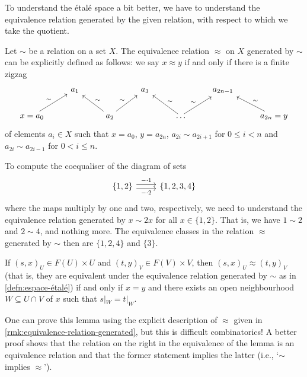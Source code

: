 To understand the étalé space a bit better, we have to understand the equivalence relation generated by the given relation, with respect to which we take the quotient.

\begin{rmk}\label{rmk:equivalence-relation-generated}
Let $\sim$ be a relation on a set $X$.
The equivalence relation $\approx$ on $X$ generated by $\sim$ can be explicitly defined as follows: we say $x\approx y$ if and only if there is a finite zigzag
\begin{equation*}
    \begin{tikzcd}
        & a_1 & & a_3 & & a_{2n-1} \\
        x = a_0 \ar[ru, "\sim"] & & a_2 \ar[lu, "\sim"'] \ar[ru, "\sim"] & & \ldots \ar[lu, "\sim"'] \ar[ru, "\sim"] & & a_{2n}=y \ar[lu, "\sim"']
    \end{tikzcd}
\end{equation*}
of elements $a_i\in X$ such that $x=a_0$, $y=a_{2n}$, $a_{2i}\sim a_{2i+1}$ for $0\leq i<n$ and $a_{2i}\sim a_{2i-1}$ for $0<i\leq n$.
\end{rmk}

\begin{exmp}
To compute the coequaliser of the diagram of sets
\begin{equation*}
    \begin{tikzcd}
        \{1,2\} \ar[r, shift left, "-\cdot 1"] \ar[r, shift right, "-\cdot 2"'] & \{1,2,3,4\}
    \end{tikzcd}
\end{equation*}
where the maps multiply by one and two, respectively, we need to understand the equivalence relation generated by $x\sim 2x$ for all $x\in\{1,2\}$.
That is, we have $1\sim 2$ and $2\sim 4$, and nothing more.
The equivalence classes in the relation $\approx$ generated by $\sim$ then are $\{1,2,4\}$ and $\{3\}$.
\end{exmp}

\begin{lem}
If $(s,x)_U\in F(U)\times U$ and $(t,y)_V\in F(V)\times V$, then $(s,x)_U\approx (t,y)_V$ (that is, they are equivalent under the equivalence relation generated by $\sim$ as in \cref{defn:espace-étalé}) if and only if $x = y$ and there exists an open neighbourhood $W\subseteq U\cap V$ of $x$ such that $s|_W = t|_W$.
\end{lem}

One can prove this lemma using the explicit description of $\approx$ given in \cref{rmk:equivalence-relation-generated}, but this is difficult combinatorics!
A better proof shows that the relation on the right in the equivalence of the lemma is an equivalence relation and that the former statement implies the latter (i.e., `$\sim$ implies $\approx$').

